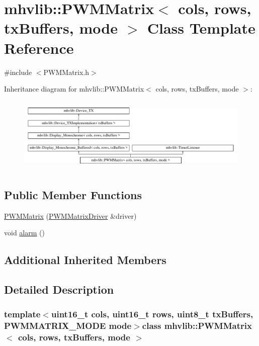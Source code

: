 \hypertarget{classmhvlib_1_1_p_w_m_matrix}{\section{mhvlib\-:\-:P\-W\-M\-Matrix$<$ cols, rows, tx\-Buffers, mode $>$ Class Template Reference}
\label{classmhvlib_1_1_p_w_m_matrix}
}


{\ttfamily \#include $<$P\-W\-M\-Matrix.\-h$>$}

Inheritance diagram for mhvlib\-:\-:P\-W\-M\-Matrix$<$ cols, rows, tx\-Buffers, mode $>$\-:\begin{figure}[H]
\begin{center}
\leavevmode
\includegraphics[height=3.655353cm]{classmhvlib_1_1_p_w_m_matrix}
\end{center}
\end{figure}
\subsection*{Public Member Functions}
\begin{DoxyCompactItemize}
\item 
\hyperlink{classmhvlib_1_1_p_w_m_matrix_af51830ca25564a0b6e43eb18e959d342}{P\-W\-M\-Matrix} (\hyperlink{classmhvlib_1_1_p_w_m_matrix_driver}{P\-W\-M\-Matrix\-Driver} \&driver)
\item 
void \hyperlink{classmhvlib_1_1_p_w_m_matrix_a30b89cdb739cf937558eea7e5b38c4f8}{alarm} ()
\end{DoxyCompactItemize}
\subsection*{Additional Inherited Members}


\subsection{Detailed Description}
\subsubsection*{template$<$uint16\-\_\-t cols, uint16\-\_\-t rows, uint8\-\_\-t tx\-Buffers, P\-W\-M\-M\-A\-T\-R\-I\-X\-\_\-\-M\-O\-D\-E mode$>$class mhvlib\-::\-P\-W\-M\-Matrix$<$ cols, rows, tx\-Buffers, mode $>$}

